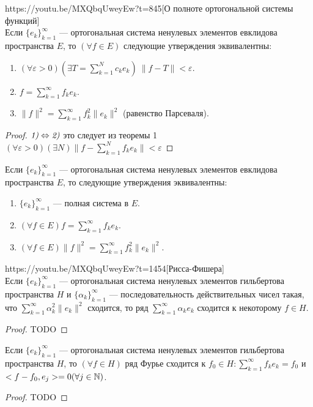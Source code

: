 \begin{linkthm}{https://youtu.be/MXQbqUweyEw?t=845}[О полноте ортогональной системы функций]\ \\
	Если $\{e_k\}_{k=1}^\infty$ --- ортогональная система ненулевых элементов евклидова пространства $E$, то $(\forall f\in E)$ следующие утверждения эквивалентны:
	\begin{enumerate}
		\item $(\forall\varepsilon>0)(\exists T=\sum\limits_{k=1}^Nc_ke_k)\ \|f-T\|<\varepsilon$.
		\item $f=\sum\limits_{k=1}^\infty f_ke_k$.
		\item $\|f\|^2=\sum\limits_{k=1}^\infty f_k^2\|e_k\|^2$ (равенство Парсеваля).
	\end{enumerate}
\end{linkthm}
\begin{proof}
	$\emph{1)}\Leftrightarrow\emph{2)}$ это следует из теоремы 1 $(\forall\varepsilon > 0)(\exists N) \|f-\sum\limits_{k=1}^N f_ke_k\|<\varepsilon$
\end{proof}

\begin{corollary}
	Если $\{e_k\}_{k=1}^\infty$ --- ортогональная система ненулевых элементов евклидова пространства $E$, то следующие утверждения эквивалентны:
	\begin{enumerate}
		\item $\{e_k\}_{k=1}^\infty$ --- полная система в $E$.
		\item $(\forall f\in E) f=\sum\limits_{k=1}^\infty f_ke_k$.
		\item $(\forall f\in E) \|f\|^2=\sum\limits_{k=1}^\infty f_k^2\|e_k\|^2$.
	\end{enumerate}
\end{corollary}

\begin{linkthm}{https://youtu.be/MXQbqUweyEw?t=1454}[Рисса-Фишера]\ \\
	Если $\{e_k\}_{k=1}^\infty$ --- ортогональная система ненулевых элементов гильбертова пространства $H$ и $\{\alpha_k\}_{k=1}^\infty$ --- последовательность действительных чисел такая, что $\sum\limits_{k=1}^\infty \alpha_k^2\|e_k\|^2$ сходится, то ряд $\sum\limits_{k=1}^\infty \alpha_ke_k$ сходится к некоторому $f\in H$.
\end{linkthm}
\begin{proof}
	TODO
\end{proof}

\begin{corollary}
	Если $\{e_k\}_{k=1}^\infty$ --- ортогональная система ненулевых элементов гильбертова пространства $H$, то $(\forall f\in H)$ ряд Фурье сходится к $f_0\in H: \sum\limits_{k=1}^\infty f_ke_k=f_0$ и $<f-f_0,e_j>=0 (\forall j\in \mathbb{N})$.
\end{corollary}
\begin{proof}
TODO
\end{proof}

